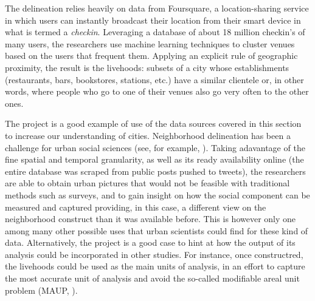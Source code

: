 \documentclass[12pt]{article}
\begin{document}
The delineation relies heavily on data from Foursquare, a location-sharing service
in which users can instantly broadcast their location from their smart
device in what is termed a \textit{checkin}. Leveraging a database of about 18
million checkin's of many users, the researchers use machine
learning techniques to cluster venues based on the users that frequent them.
Applying an explicit rule of geographic proximity, the result is the
livehoods: subsets of a city whose establishments (restaurants, bars, bookstores, stations,
etc.) have a similar clientele or, in other words, where people who go to one
of their venues also go very often to the other ones.

The project is a good example of use of the data sources covered in this
section to increase our understanding of cities. Neighborhood delineation has
been a challenge for urban social sciences (see, for example,
\citealp{rey2011dynamics}).
Taking adavantage of the fine
spatial and temporal granularity, as well as its ready availability
online (the entire database was scraped from public posts pushed to
tweets), the researchers are able to obtain urban pictures
that would not be feasible with traditional methods such as surveys, and to gain
insight on how the social component can be measured and captured providing, in
this case, a different view on the neighborhood construct than it was
available before.
This is however only one among many other possible uses that urban
scientists could find for these kind of data. Alternatively, the project is a
good case to hint at how the output of its analysis could be incorporated in other
studies. For instance, once constructred, the livehoods could be used as the main units of
analysis, in an effort to capture the most accurate unit of analysis and avoid
the so-called modifiable areal unit problem (MAUP,
\citealp{openshaw1981modifiable}).
\end{document}
